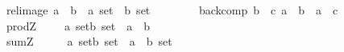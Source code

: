 \begin{isabellebody}
\ \ rel{\isacharunderscore}image\ {\isacharcolon}{\isacharcolon}{\isachardoublequoteopen}{\isacharparenleft}{\isacharprime}a\ {\isacharless}{\isacharequal}{\isachargreater}\ {\isacharprime}b{\isacharparenright}\ {\isacharequal}{\isachargreater}\ {\isacharparenleft}{\isacharprime}a\ set{\isacharparenright}\ {\isacharequal}{\isachargreater}\ {\isacharprime}b\ set{\isachardoublequoteclose}\ \ \ \ \ \ {\isacharparenleft}{\isachardoublequoteopen}{\isacharunderscore}{\isasymlimg}{\isacharunderscore}{\isasymrimg}{\isachardoublequoteclose}{\isacharbrackleft}{}{}{}{}{\isacharcomma}{}{\isacharbrackright}{}{}{}{\isacharparenright}\isanewline
\ \ back{\isacharunderscore}comp\ {\isacharcolon}{\isacharcolon}{\isachardoublequoteopen}{\isacharbrackleft}{\isacharprime}b\ {\isacharless}{\isacharequal}{\isachargreater}\ {\isacharprime}c{\isacharcomma}\ {\isacharprime}a\ {\isacharless}{\isacharequal}{\isachargreater}\ {\isacharprime}b{\isacharbrackright}\ {\isacharequal}{\isachargreater}\ {\isacharparenleft}{\isacharprime}a\ {\isacharless}{\isacharequal}{\isachargreater}\ {\isacharprime}c{\isacharparenright}{\isachardoublequoteclose}\ \ {\isacharparenleft}{\isachardoublequoteopen}{\isacharunderscore}\ {\isasymcirc}\ {\isacharunderscore}{\isachardoublequoteclose}\ \ {\isacharbrackleft}{}{}{\isacharcomma}{}{}{\isacharbrackright}\ {}{}{\isacharparenright}\isanewline
\ \ prodZ\ \ \ \ \ {\isacharcolon}{\isacharcolon}{\isachardoublequoteopen}{\isacharbrackleft}{\isacharprime}a\ set{\isacharcomma}{\isacharprime}b\ set{\isacharbrackright}\ {\isacharequal}{\isachargreater}\ {\isacharparenleft}{\isacharprime}a\ {\isacharless}{\isacharequal}{\isachargreater}\ {\isacharprime}b{\isacharparenright}\ {\isachardoublequoteclose}\ \ \ \ \ \ \ \ {\isacharparenleft}{\isachardoublequoteopen}{\isacharunderscore}\ {\isasymtimes}\ {\isacharunderscore}{\isachardoublequoteclose}\ {\isacharbrackleft}{}{}{\isacharcomma}{}{}{\isacharbrackright}\ {}{}{\isacharparenright}\isanewline
\ \ sumZ\ \ \ \ \ \ {\isacharcolon}{\isacharcolon}{\isachardoublequoteopen}{\isacharbrackleft}{\isacharprime}a\ set{\isacharcomma}{\isacharprime}b\ set{\isacharbrackright}\ {\isacharequal}{\isachargreater}\ {\isacharparenleft}{\isacharprime}a\ {\isacharplus}\ {\isacharprime}b{\isacharparenright}\ set{\isachardoublequoteclose}\ \ \ \ \ \ \ {\isacharparenleft}{\isachardoublequoteopen}{\isacharunderscore}\ {\isasymsumZ}\ {\isacharunderscore}{\isachardoublequoteclose}\ \ {\isacharbrackleft}{}{}{\isacharcomma}{}{}{\isacharbrackright}\ {}{}{\isacharparenright}\isanewline

\end{isabellebody}
